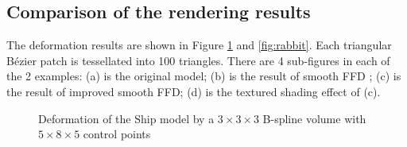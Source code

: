 \documentclass[3p]{elsarticle}
\begin{document}
\subsection{Comparison of the rendering results}
\label{sec:comparison_of_rendering}

The deformation results are shown in Figure \ref{fig:ship} and \ref{fig:rabbit}. Each triangular B\'ezier patch is tessellated into 100 triangles. There are 4 sub-figures in each of the 2 examples: (a) is the original model; (b) is the result of smooth FFD \cite{Cui13, Cui14}; (c) is the result of improved smooth FFD; (d) is the textured shading effect of (c).


\begin{figure}[htbp]
\begin{center}
	\begin{minipage}[l]{0.99\textwidth}
		\centering
		\caption{Deformation of the Ship model by a $3\times3\times3$ B-spline volume with $5\times8\times5$ control points}
		\label{fig:ship}
	\end{minipage}
\end{center}
\end{figure}
\end{document}
